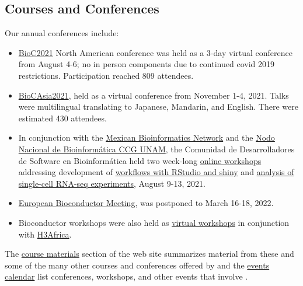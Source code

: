 \documentclass[letterpaper]{article}
\begin{document}
\subsection{Courses and Conferences}

Our annual conferences include:

\begin{itemize}
\item \href{https://bioc2021.bioconductor.org}{BioC2021} North American
  conference was held as a 3-day virtual conference from August 4-6; no in
  person components due to continued covid 2019 restrictions. Participation
  reached 809 attendees.    
\item \href{https://biocasia2021.bioconductor.org/}{BioCAsia2021}, held
  as a virtual conference from November 1-4, 2021. Talks were multilingual
  translating to Japanese, Mandarin, and English. There were estimated 430
  attendees.
\item In conjunction with the \href{https://twitter.com/RBioinformatica}{Mexican Bioinformatics Network} and
the \href{https://twitter.com/nnb_unam}{Nodo Nacional de Bioinformática CCG UNAM},
the Comunidad de Desarrolladores de Software en Bioinformática
held two week-long
\href{https://comunidadbioinfo.github.io/post/cdsb-2021-workshops/#.YOgqyhNuelY}{online workshops}
addressing development of
\href{https://comunidadbioinfo.github.io/cdsb2021_workflows/}{workflows with RStudio and shiny} and
\href{https://comunidadbioinfo.github.io/cdsb2021_scRNAseq/}{analysis of single-cell RNA-seq experiments},
August 9-13, 2021.

\item \href{https://eurobioc2022.bioconductor.org/}{European
  Bioconductor Meeting}, was postponed to March 16-18, 2022.
\item Bioconductor workshops were also held as \href{https://www.h3abionet.org/categories/event/workshop/introduction-to-hands-on-bioconductor-workshop}{virtual workshops} in conjunction
  with \href{https://h3africa.org/}{H3Africa}.
\end{itemize}


The \href{https://bioconductor.org/help/course-materials/}{course
  materials} section of the web site summarizes material from these
and some of the many other courses and conferences offered by
\Bioconductor and the \href{https://bioconductor.org/help/events/}{events
  calendar} list conferences, workshops, and other events that involve
\Bioconductor.
\end{document}
